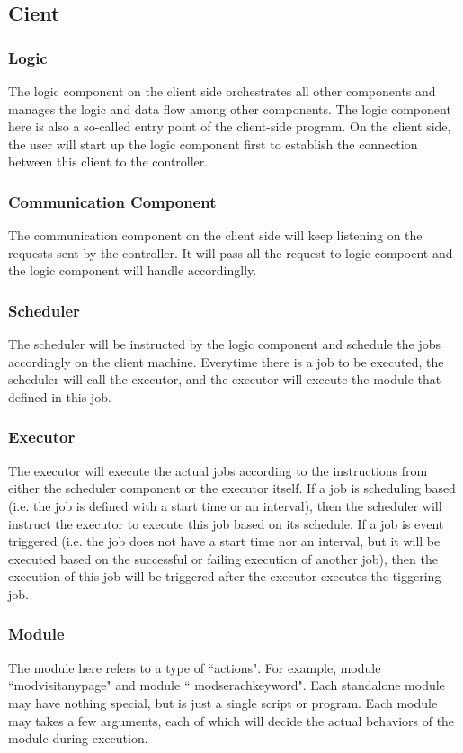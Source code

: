 \documentclass[12pt]{report}
\begin{document}
\subsection{Cient}

\subsubsection{Logic}
The logic component on the client side orchestrates all other components and manages the logic and data flow among other components. The logic component here is also a so-called entry point of the client-side program. On the client side, the user will start up the logic component first to establish the connection between this client to the controller.

\subsubsection{Communication Component}
The communication component on the client side will keep listening on the requests sent by the controller. It will pass all the request to logic compoent and the logic component will handle accordinglly. 

\subsubsection{Scheduler}
The scheduler will be instructed by the logic component and schedule the jobs accordingly on the client machine. Everytime there is a job to be executed, the scheduler will call the executor, and the executor will execute the module that defined in this job.

\subsubsection{Executor}
The executor will execute the actual jobs according to the instructions from either the scheduler component or the executor itself. If a job is scheduling based (i.e. the job is defined with a start time or an interval), then the scheduler will instruct the executor to execute this job based on its schedule. If a job is event triggered (i.e. the job does not have a start time nor an interval, but it will be executed based on the successful or failing execution of another job), then the execution of this job will be triggered after the executor executes the tiggering job. 

\subsubsection{Module}
The module here refers to a type of ``actions". For example, module ``mod\textunderscore visit\textunderscore any\textunderscore page" and module `` mod\textunderscore serach\textunderscore keyword". Each standalone module may have nothing special, but is just a single script or program. Each module may takes a few arguments, each of which will decide the actual behaviors of the module during execution. 
\end{document}
